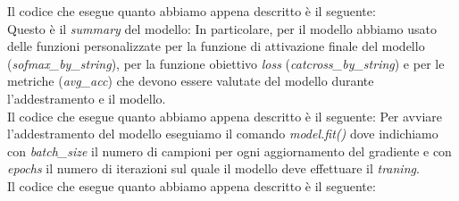 Il codice che esegue quanto abbiamo appena descritto è il seguente:\\
\newline
\vspace*{2ex}
\vspace*{2ex}
Questo è il \textit{summary} del modello:
\vspace*{2ex}
\vspace*{2ex}
In particolare, per il modello abbiamo usato delle funzioni personalizzate per la funzione di attivazione finale del modello (\textit{sofmax\_by\_string}), per la funzione obiettivo \textit{loss} (\textit{catcross\_by\_string}) e per le metriche (\textit{avg\_acc}) che devono essere valutate del modello durante l'addestramento e il modello.\\
\newline
Il codice che esegue quanto abbiamo appena descritto è il seguente:
\vspace*{2ex}
\vspace*{2ex}
Per avviare l'addestramento del modello eseguiamo il comando \textit{model.fit()} dove indichiamo con \textit{batch\_size} il numero di campioni per ogni aggiornamento del gradiente e con \textit{epochs} il numero di iterazioni sul quale il modello deve effettuare il \textit{traning}.\\
\newline
Il codice che esegue quanto abbiamo appena descritto è il seguente:
\vspace*{2ex}
\vspace*{2ex}
